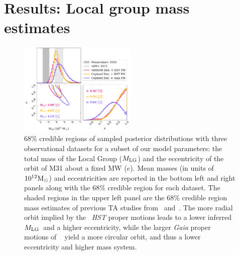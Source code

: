 \documentclass[twocolumn]{aastex631}
\newcommand{\mlg}{\ensuremath{M_{\rm LG}}}
\begin{document}
\section{Results: Local group mass estimates}
\label{sec:results}
\begin{figure}[htb]
  \centering
  \includegraphics[width=0.5\textwidth]
  {analyze-runs-contour.pdf}
  \caption{\label{fig:contour} 68\% credible regions of sampled posterior
  distributions with three observational datasets for a subset of our model
  parameters: the total mass of the Local Group (\mlg)
  and the eccentricity of the orbit of M31 about a fixed MW ($e$).
  Mean masses (in units of $10^{12}\mathrm{M}_\odot$) and eccentricities are reported in
  the bottom left and right panels along with the 68\% credible region for each
  dataset.
  The shaded regions in the upper left panel are the 68\% credible region mass
  estimates of previous TA studies from~\cite{vdm2012}
  and~\cite{Penarrubia2016}.
  The more radial orbit implied by the~\cite{vdm2012} \textit{HST} proper
  motions leads to a lower inferred \mlg\ and a higher
  eccentricity, while the larger \textit{Gaia} proper motions of
  ~\cite{Salomon2021} yield a more circular orbit, and thus a lower eccentricity
   and higher mass system.
   }
\end{figure}
\end{document}
